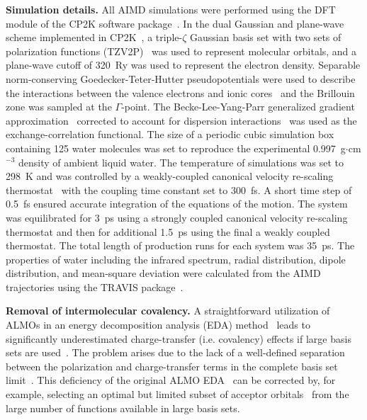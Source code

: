 \documentclass[journal=jacsat,manuscript=article]{achemso}
\begin{document}
\textbf{Simulation details.} All AIMD simulations were performed using the DFT module of the CP2K software package~\cite{www:cp2k}. 
In the dual Gaussian and plane-wave scheme implemented in CP2K~\cite{hutter2014cp2k}, a triple-$\zeta$ Gaussian basis set with two sets of polarization functions (TZV2P)~\cite{vandevondele2007gaussian} was used to represent molecular orbitals, and a plane-wave cutoff of 320~Ry was used to represent the electron density. 
Separable norm-conserving Goedecker-Teter-Hutter pseudopotentials were used to describe the interactions between the valence electrons and ionic cores~\cite{goedecker1996separable,krack2005pseudopotentials} and the Brillouin zone was sampled at the $\Gamma$-point. 
The Becke-Lee-Yang-Parr generalized gradient approximation~\cite{becke1988density, lee1988development} corrected to account for dispersion interactions~\cite{grimme2010consistent} was used as the exchange-correlation functional. 
The size of a periodic cubic simulation box containing 125 water molecules was set to reproduce the experimental 0.997~g$\cdot$cm$^{-3}$ density of ambient liquid water. 
The temperature of simulations was set to 298~K and was controlled by a weakly-coupled canonical velocity re-scaling thermostat~\cite{bussi2007canonical} with the coupling time constant set to 300~fs. 
A short time step of 0.5~fs ensured accurate integration of the equations of the motion. 
The system was equilibrated for 3~ps using a strongly coupled canonical velocity re-scaling thermostat and then for additional 1.5~ps using the final a weakly coupled thermostat. 
The total length of production runs for each system was 35~ps. 
The properties of water including the infrared spectrum, radial distribution, dipole distribution, and mean-square deviation were calculated from the AIMD trajectories using the TRAVIS package~\cite{brehm2011travis}.  

\textbf{Removal of intermolecular covalency.} A straightforward utilization of ALMOs in an energy decomposition analysis (EDA) method~\cite{khaliullin2007unravelling} leads to significantly underestimated charge-transfer (i.e. covalency) effects if large basis sets are used~\cite{horn2015polarization,lao2016energy}. 
The problem arises due to the lack of a well-defined separation between the polarization and charge-transfer terms in the complete basis set limit~\cite{misquitta2013charge,horn2015polarization}. 
This deficiency of the original ALMO EDA~\cite{khaliullin2007unravelling} can be corrected by, for example, selecting an optimal but limited subset of acceptor orbitals~\cite{horn2015polarization} from the large number of functions available in large basis sets. 
\end{document}
